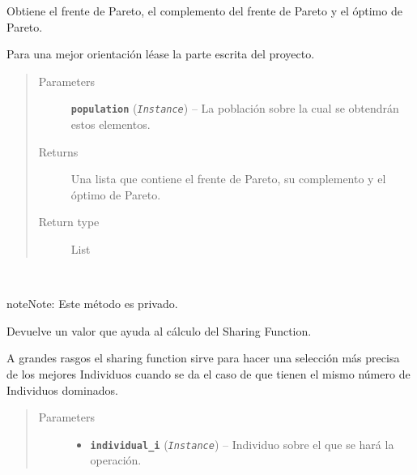 \documentclass[letterpaper,10pt,english]{sphinxmanual}
\begin{document}
\begin{fulllineitems}
\begin{fulllineitems}
\begin{DUlineblock}{0em}
\item[] Obtiene el frente de Pareto, el complemento del frente de Pareto y el óptimo de Pareto.
\item[] Para una mejor orientación léase la parte escrita del proyecto.
\end{DUlineblock}
\begin{quote}\begin{description}
\item[{Parameters}] \leavevmode
\textbf{\texttt{population}} (\emph{\texttt{Instance}}) -- La población sobre la cual se obtendrán estos elementos.

\item[{Returns}] \leavevmode
Una lista que contiene el frente de Pareto, su complemento y el óptimo de Pareto.

\item[{Return type}] \leavevmode
List

\end{description}\end{quote}

\end{fulllineitems}


\begin{fulllineitems}
\label{Model/Community/Community:Model.Community.Community.Community._Community__using_sharing_function}~
\begin{notice}{note}{Note:}
Este método es privado.
\end{notice}

\begin{DUlineblock}{0em}
\item[] Devuelve un valor que ayuda al cálculo del Sharing Function.
\item[] A grandes rasgos el sharing function sirve para hacer una selección más precisa de los
mejores Individuos cuando se da el caso de que tienen el mismo número de Individuos dominados.
\end{DUlineblock}
\begin{quote}\begin{description}
\item[{Parameters}] \leavevmode\begin{itemize}
\item {} 
\textbf{\texttt{individual\_i}} (\emph{\texttt{Instance}}) -- Individuo sobre el que se hará la operación.


\end{itemize}
\end{description}
\end{quote}
\end{fulllineitems}
\end{fulllineitems}
\end{document}
